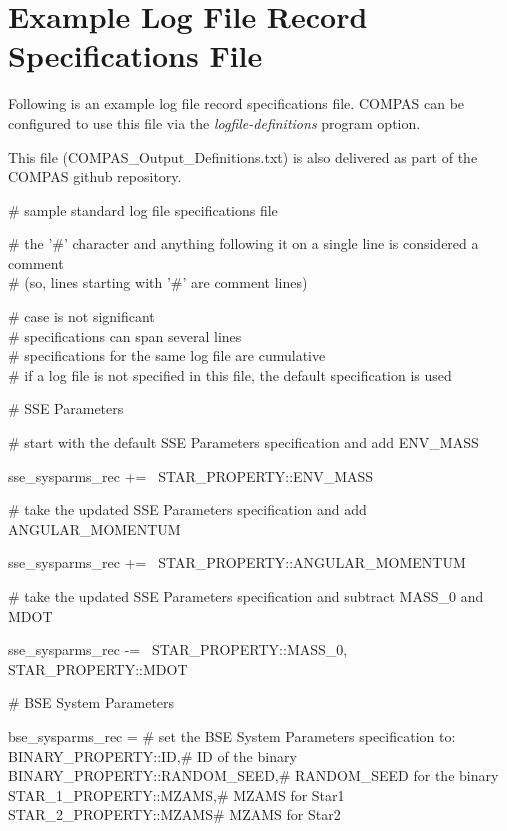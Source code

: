 \section{Example Log File Record Specifications File}
\label{sec:ExampleLogFileRecordSpecsFile}

Following is an example log file record specifications file.  COMPAS can be configured to use this file via the \textit{logfile-definitions} program option.

This file (COMPAS\_Output\_Definitions.txt) is also delivered as part of the COMPAS github repository.

\# sample standard log file specifications file

\# the '\#' character and anything following it on a single line is considered a comment \\
\# (so, lines starting with '\#' are comment lines)

\# case is not significant \\
\# specifications can span several lines \\
\# specifications for the same log file are cumulative \\
\# if a log file is not specified in this file, the default specification is used

\medskip
\# SSE Parameters

\# start with the default SSE Parameters specification and add ENV\_MASS

\small
sse\_sysparms\_rec += \lcb\ STAR\_PROPERTY::ENV\_MASS\ \rcb
\normalsize

\# take the updated SSE Parameters specification and add ANGULAR\_MOMENTUM

sse\_sysparms\_rec += \lcb\ STAR\_PROPERTY::ANGULAR\_MOMENTUM\ \rcb

\# take the updated SSE Parameters specification and subtract MASS\_0 and MDOT

sse\_sysparms\_rec -= \lcb\ STAR\_PROPERTY::MASS\_0, STAR\_PROPERTY::MDOT\ \rcb         

\medskip
\# BSE System Parameters

\small
bse\_sysparms\_rec = \lcb\tabto{20em}\# set the BSE System Parameters specification to: \\
\tabto{1.75em}BINARY\_PROPERTY::ID,\tabto{20em}\# ID of the binary \\
\tabto{1.75em}BINARY\_PROPERTY::RANDOM\_SEED,\tabto{20em}\# RANDOM\_SEED for the binary \\ \tabto{1.75em}STAR\_1\_PROPERTY::MZAMS,\tabto{20em}\# MZAMS for Star1 \\ \tabto{1.75em}STAR\_2\_PROPERTY::MZAMS\tabto{20em}\# MZAMS for Star2 \\
\rcb
\normalsize

